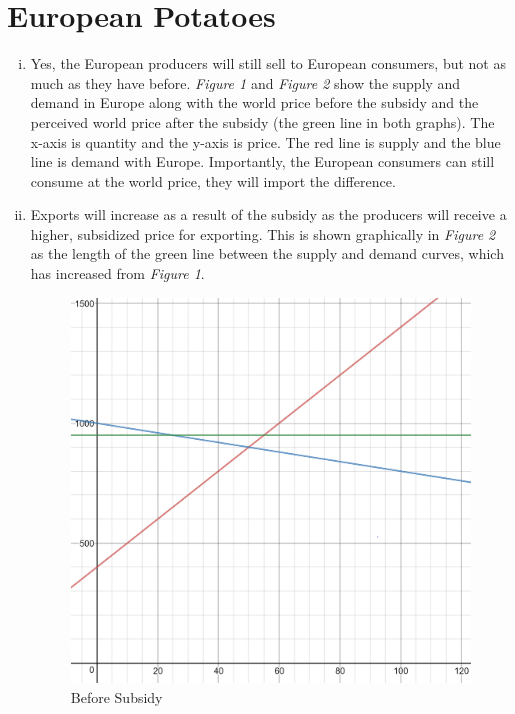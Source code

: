 \documentclass{article}
\begin{document}
\section{ European Potatoes }

\begin{enumerate}[i.]
    \item Yes, the European producers will still sell to European consumers, but
        not as much as they have before. \textit{Figure 1} and \textit{Figure 2}
        show the supply and demand in Europe along with the world price before
        the subsidy and the perceived world price after the subsidy (the green
        line in both graphs).  The x-axis is quantity and the y-axis is price.
        The red line is supply and the blue line is demand with Europe.
        Importantly, the European consumers can still consume at the world
        price, they will import the difference.

    \item Exports will increase as a result of the subsidy as the producers will
        receive a higher, subsidized price for exporting. This is shown
        graphically in \textit{Figure 2} as the length of the green line between
        the supply and demand curves, which has increased from \textit{Figure
        1}.

        \begin{figure}[H]
            \centering
            \includegraphics[scale=0.40]{"Before Subsidy"}
            \caption{Before Subsidy}
        \end{figure}


\end{enumerate}
\end{document}
